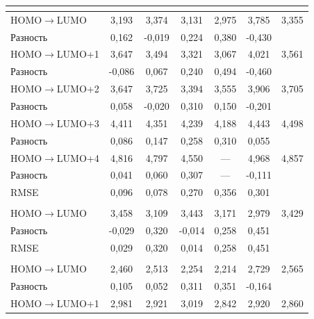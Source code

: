 \documentclass[a4paper,12pt]{article}
\newcommand{\rarr}{\rightarrow}
\begin{document}
\begin{onehalfspace}
\begin{table}[H]
\begin{tabular}{|l|c|c|c|c|c|c|}
			\multicolumn{7}{|c|}{\ce{Cu2[SCH3]2}}                                        \\ \hline
			HOMO$\rarr$LUMO   & 3,193     & 3,374     & 3,131  & 2,975  & 3,785  & 3,355 \\ \hline
			Разность          & 0,162     & -0,019    & 0,224  & 0,380  & -0,430 &       \\ \hline
			HOMO$\rarr$LUMO+1 & 3,647     & 3,494     & 3,321  & 3,067  & 4,021  & 3,561 \\ \hline
			Разность          & -0,086    & 0,067     & 0,240  & 0,494  & -0,460 &       \\ \hline
			HOMO$\rarr$LUMO+2 & 3,647     & 3,725     & 3,394  & 3,555  & 3,906  & 3,705 \\ \hline
			Разность          & 0,058     & -0,020    & 0,310  & 0,150  & -0,201 &       \\ \hline
			HOMO$\rarr$LUMO+3 & 4,411     & 4,351     & 4,239  & 4,188  & 4,443  & 4,498 \\ \hline
			Разность          & 0,086     & 0,147     & 0,258  & 0,310  & 0,055  &       \\ \hline
			HOMO$\rarr$LUMO+4 & 4,816     & 4,797     & 4,550  & —      & 4,968  & 4,857 \\ \hline
			Разность          & 0,041     & 0,060     & 0,307  & —      & -0,111 &       \\ \hline
			RMSE              & 0,096     & 0,078     & 0,270  & 0,356  & 0,301  &       \\ \hline \hline
			\multicolumn{7}{|c|}{\ce{Cu3[SCH3]2}}                                        \\ \hline
			HOMO$\rarr$LUMO   & 3,458     & 3,109     & 3,443  & 3,171  & 2,979  & 3,429 \\ \hline
			Разность          & -0,029    & 0,320     & -0,014 & 0,258  & 0,451  &       \\ \hline
			RMSE              & 0,029     & 0,320     & 0,014  & 0,258  & 0,451  &       \\ \hline \hline
			\multicolumn{7}{|c|}{\ce{Cu4[SCH3]3}}                                        \\ \hline
			HOMO$\rarr$LUMO   & 2,460     & 2,513     & 2,254  & 2,214  & 2,729  & 2,565 \\ \hline
			Разность          & 0,105     & 0,052     & 0,311  & 0,351  & -0,164 &       \\ \hline
			HOMO$\rarr$LUMO+1 & 2,981     & 2,921     & 3,019  & 2,842  & 2,920  & 2,860 \\ \hline

\end{tabular}
\end{table}
\end{onehalfspace}
\end{document}
